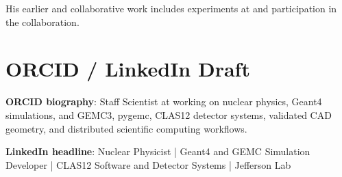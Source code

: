 \documentclass[11pt,letterpaper]{article}
\begin{document}
His earlier and collaborative work includes experiments at \MauriSPringEight{}
and participation in the \MauriHPS{} collaboration.

\section*{ORCID / LinkedIn Draft}
\textbf{ORCID biography}: Staff Scientist at \MauriJLab{} working on nuclear
physics, Geant4 simulations, \MauriGEMC{} and GEMC3, pygemc, CLAS12 detector
systems, validated CAD geometry, and distributed scientific computing workflows.

\textbf{LinkedIn headline}: Nuclear Physicist | Geant4 and GEMC Simulation
Developer | CLAS12 Software and Detector Systems | Jefferson Lab
\end{document}
